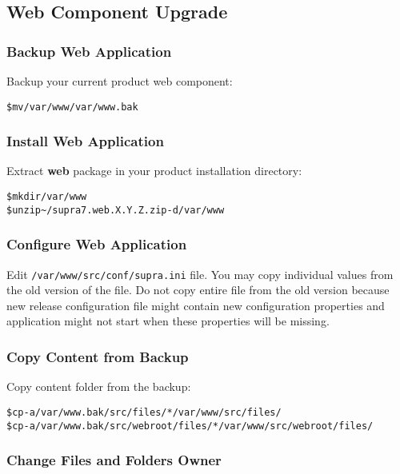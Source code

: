 \documentclass[12pt]{article}
\newcommand{\vigPackageName}{supra7}
\newcommand{\vigPathToProject}{/var/www}
\newcommand{\vigPathToSrc}{/src}
\newcommand{\vigReleasePath}{\textasciitilde/}
\newcommand{\vigReleaseVersion}{X.Y.Z}
\begin{document}
\subsection{Web Component Upgrade}

\subsubsection{Backup Web Application}
Backup your current product web component:

\begin{alltt}
\$ mv \vigPathToProject \vigPathToProject.bak
\end{alltt}

\subsubsection{Install Web Application}
Extract \textbf{web} package in your product installation directory:

\begin{alltt}
\$ mkdir \vigPathToProject
\$ unzip {\vigReleasePath}{\vigPackageName}.web.\vigReleaseVersion.zip -d \vigPathToProject
\end{alltt}

\subsubsection{Configure Web Application}
Edit \texttt{\vigPathToProject\vigPathToSrc/conf/supra.ini} file. You may copy individual values from the old version of the file. Do not copy entire file from the old version because new release configuration file might contain new configuration properties and application might not start when these properties will be missing.

\subsubsection{Copy Content from Backup}
Copy content folder from the backup:

\begin{alltt}
\$ cp -a \vigPathToProject.bak\vigPathToSrc/files/* \vigPathToProject\vigPathToSrc/files/
\$ cp -a \vigPathToProject.bak\vigPathToSrc/webroot/files/* \vigPathToProject\vigPathToSrc/webroot/files/
\end{alltt}

\subsubsection{Change Files and Folders Owner}
\end{document}
